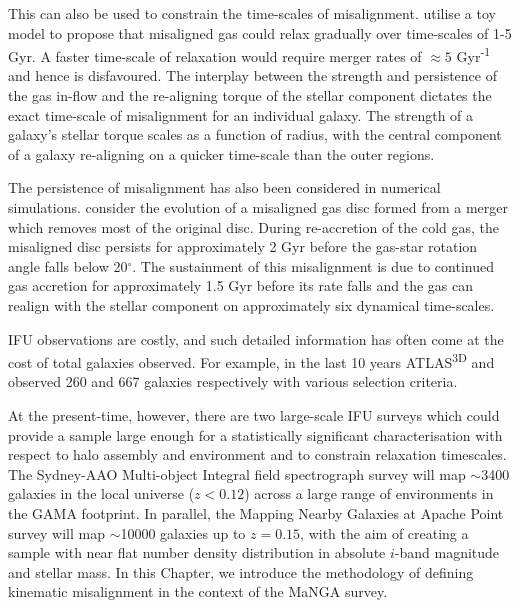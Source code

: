 This can also be used to constrain the time-scales of misalignment. \citet{davis2016} utilise a toy model to propose that misaligned gas could relax gradually over time-scales of 1-5 Gyr. A faster time-scale of relaxation would require merger rates of $\approx 5$ Gyr\textsuperscript{-1} and hence is disfavoured. The interplay between the strength and persistence of the gas in-flow and the re-aligning torque of the stellar component dictates the exact time-scale of misalignment for an individual galaxy. The strength of a galaxy's stellar torque scales as a function of radius, with the central component of a galaxy re-aligning on a quicker time-scale than the outer regions. 

The persistence of misalignment has also been considered in numerical simulations. \citet{vdvoort2015} consider the evolution of a misaligned gas disc formed from a merger which removes most of the original disc. During re-accretion of the cold gas, the misaligned disc persists for approximately 2 Gyr before the gas-star rotation angle falls below 20$^{\circ}$. The sustainment of this misalignment is due to continued gas accretion for approximately 1.5 Gyr before its rate falls and the gas can realign with the stellar component on approximately six dynamical time-scales. 

IFU observations are costly, and such detailed information has often come at the cost of total galaxies observed. For example, in the last 10 years ATLAS\textsuperscript{3D} and  \citep{califa} observed 260 and 667 galaxies respectively with various selection criteria. 

 At the present-time, however, there are two large-scale IFU surveys which could provide a sample large enough for a statistically significant characterisation with respect to halo assembly and environment and to constrain relaxation timescales. The Sydney-AAO Multi-object Integral field spectrograph survey \citep[SAMI;][]{croom2012,bryant2015} will map $\sim$3400 galaxies in the local universe ($z < 0.12$) across a large range of environments in the GAMA footprint. In parallel, the Mapping Nearby Galaxies at Apache Point \citep[MaNGA;][]{bundy2015,blanton2017} survey will map $\sim$10000 galaxies up to $z = 0.15$, with the aim of creating a sample with near flat number density distribution in absolute $i$-band magnitude and stellar mass. In this Chapter, we introduce the methodology of defining kinematic misalignment in the context of the MaNGA survey. 

